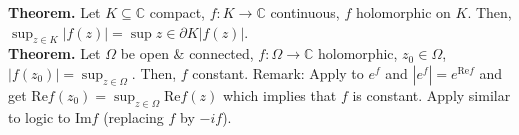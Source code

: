 \documentclass[12pt]{article}
\theoremstyle{definition}
\theoremstyle{named}
\begin{document}
\textbf{Theorem. } Let $K \subseteq \mathbb{C}$ compact, $f: K \to \mathbb{C}$ continuous, $f$ holomorphic on $K$. Then, $\sup_{z \in K} |f(z)| = \sup{z \in \partial K} |f(z)|$. 
\\
\textbf{Theorem. } Let $\Omega$ be open \& connected, $f: \Omega \to \mathbb{C}$ holomorphic, $z_0 \in \Omega$, $|f(z_0)| = \sup_{z \in \Omega}$. Then, $f$ constant. Remark: Apply to $e^f$ and $|e^f| = e^{\textrm{Re}f}$ and get $\textrm{Re} f(z_0) = \sup_{z \in \Omega}\textrm{Re}f(z)$ which implies that $f$ is constant. Apply similar to logic to $\textrm{Im}f$ (replacing $f$ by $-if$). 
\end{document}
